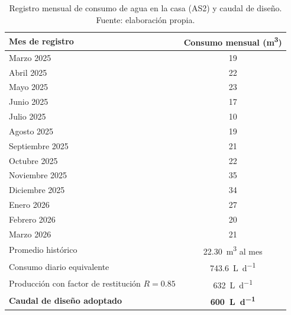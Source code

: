 \begin{table}[htbp]
  \centering
  \caption{Registro mensual de consumo de agua en la casa (AS2) y caudal de diseño. Fuente: elaboración propia.}
  \label{tab:consumo-casa}
  \begin{tabular}{lc}
    \toprule
    Mes de registro & Consumo mensual (\unit{\cubic\meter}) \\
    \midrule
    Marzo 2025 & 19 \\
    Abril 2025 & 22 \\
    Mayo 2025 & 23 \\
    Junio 2025 & 17 \\
    Julio 2025 & 10 \\
    Agosto 2025 & 19 \\
    Septiembre 2025 & 21 \\
    Octubre 2025 & 22 \\
    Noviembre 2025 & 35 \\
    Diciembre 2025 & 34 \\
    Enero 2026 & 27 \\
    Febrero 2026 & 20 \\
    Marzo 2026 & 21 \\
    \midrule
    Promedio histórico & \qty{22.30}{\cubic\meter} al mes \\
    Consumo diario equivalente & \qty{743.6}{\liter\per\day} \\
    \midrule
    Producción con factor de restitución $R = \num{0.85}$ & \qty{632}{\liter\per\day} \\
    \textbf{Caudal de diseño adoptado} & \textbf{\qty{600}{\liter\per\day}} \\
    \bottomrule
  \end{tabular}
\end{table}


